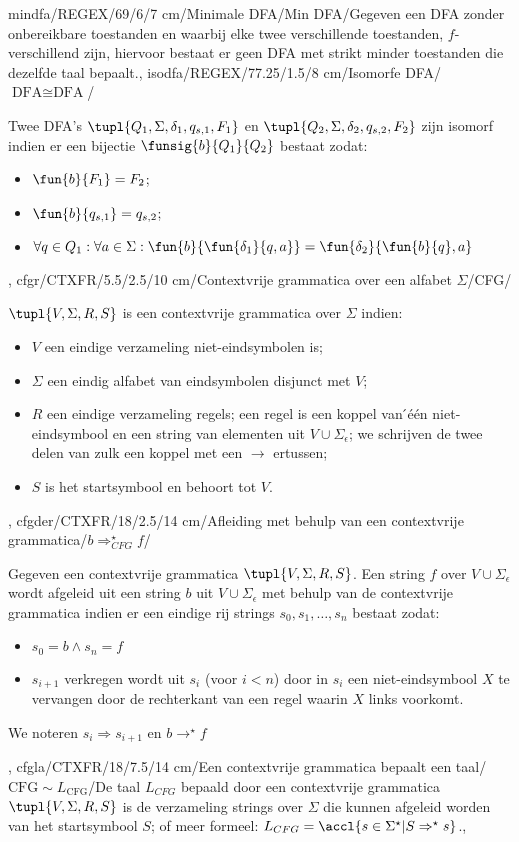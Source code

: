 mindfa/REGEX/69/6/7 cm/{Minimale DFA}/Min DFA/{Gegeven een DFA zonder onbereikbare toestanden en waarbij elke twee verschillende toestanden, $f$-verschillend zijn, hiervoor bestaat er geen DFA met strikt minder toestanden die dezelfde taal bepaalt.},
isodfa/REGEX/77.25/1.5/8 cm/Isomorfe DFA/{$\mbox{DFA}\cong\mbox{DFA}$}/{Twee DFA's $\tupl{Q_1,\Sigma,\delta_1,q_{s,1},F_1}$ en $\tupl{Q_2,\Sigma,\delta_2,q_{s,2},F_2}$ zijn isomorf indien er een bijectie $\funsig{b}{Q_1}{Q_2}$ bestaat zodat:\begin{itemize}\item $\fun{b}{F_1}=F_2$;\item $\fun{b}{q_{s,1}}=q_{s,2}$;\item $\forall q\in Q_1:\forall a\in\Sigma:\fun{b}{\fun{\delta_1}{q,a}}=\fun{\delta_2}{\fun{b}{q},a}$\end{itemize}},
cfgr/CTXFR/5.5/2.5/10 cm/Contextvrije grammatica over een alfabet $\Sigma$/CFG/{$\tupl{V,\Sigma,R,S}$ is een contextvrije grammatica over $\Sigma$ indien:\begin{itemize}
 \item $V$ een eindige verzameling niet-eindsymbolen is;
 \item $\Sigma$ een eindig alfabet van eindsymbolen disjunct met $V$;
 \item $R$ een eindige verzameling regels; een regel is een koppel van  ́\'e\'en niet-eindsymbool en een string van elementen uit $V\cup\Sigma_{\epsilon}$; we schrijven de twee delen van zulk een koppel met een $\rightarrow$ ertussen;
 \item $S$ is het startsymbool en behoort tot $V$.
\end{itemize}},
cfgder/CTXFR/18/2.5/14 cm/Afleiding met behulp van een contextvrije grammatica/$b\Rightarrow_{CFG}^{\star}f$/{Gegeven een contextvrije grammatica $\tupl{V,\Sigma,R,S}$. Een string $f$ over $V\cup\Sigma_{\epsilon}$ wordt afgeleid uit een string $b$ uit $V\cup\Sigma_{\epsilon}$ met behulp van de contextvrije grammatica indien er een eindige rij strings $s_0,s_1,\ldots,s_n$ bestaat zodat:\begin{itemize}
 \item $s_0=b\wedge s_n=f$
 \item $s_{i+1}$ verkregen wordt uit $s_i$ (voor $i<n$) door in $s_i$ een niet-eindsymbool $X$ te vervangen door de rechterkant van een regel waarin $X$ links voorkomt.
\end{itemize}
We noteren $s_i\Rightarrow s_{i+1}$ en $b\rightarrow^{\star}f$},
cfgla/CTXFR/18/7.5/14 cm/Een contextvrije grammatica bepaalt een taal/$\mbox{CFG}\sim L_{\mbox{CFG}}$/{De taal $L_{CFG}$ bepaald door een contextvrije grammatica $\tupl{V,\Sigma,R,S}$ is de verzameling strings over $\Sigma$ die kunnen afgeleid worden van het startsymbool $S$; of meer formeel: $L_{CFG}=\accl{s\in\Sigma^{\star}|S\Rightarrow^{\star}s}$.},
